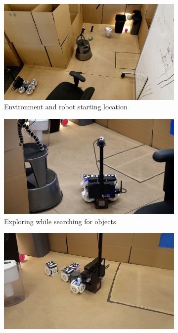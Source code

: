 \documentclass[conference]{IEEEtran}
\begin{document}
\begin{figure}[t]
      \centering
      \begin{subfigure}[t]{0.32\textwidth}
        \includegraphics[width=\textwidth]{images/overhead_starting.jpg}
        \caption{Environment and robot starting location}
    \end{subfigure}
    \begin{subfigure}[t]{0.32\textwidth}
        \includegraphics[width=\textwidth]{images/exploration.jpg}
        \caption{Exploring  while searching for objects}
    \end{subfigure}
    \begin{subfigure}[t]{0.32\textwidth}
        \includegraphics[width=\textwidth]{images/reconfiguration.png}

\end{subfigure}
\end{figure}
\end{document}
